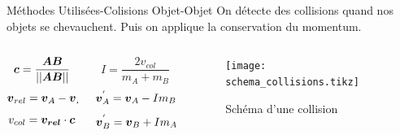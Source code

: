 \documentclass[aspectratio=169,xcolor=dvipsnames]{beamer}
\begin{document}
\begin{frame}{Méthodes Utilisées-Colisions Objet-Objet}
    On détecte des collisions quand nos objets se chevauchent. Puis on applique la conservation du momentum.
    \begin{columns}
        \begin{column}[]{0.25\textwidth}
            \[\vb*{c} = \frac{\vb*{AB}}{||\vb*{AB}||}\]
            \[\vb*{v}_{rel} = \vb*{v}_A - \vb*{v}_B\]
            \[v_{col}=\vb*{v_{rel}}\cdot\vb*{c}\]
        \end{column}
        \begin{column}[]{0.25\textwidth}
            \[I = \frac{2v_{col}}{m_A + m_B}\]
            \[\vb*{v}_A^{'} = \vb*{v}_A - Im_B\vb*{c}\]
            \[\vb*{v}_B^{'} = \vb*{v}_B + Im_A\vb*{c}\]
        \end{column}
        \begin{column}[]{0.5\textwidth}
            \begin{figure}
                \centering
                \texttt{[image: schema\_collisions.tikz]}
                \caption{Schéma d'une collision}
            \end{figure}
        \end{column}
    \end{columns}
\end{frame}
\end{document}
